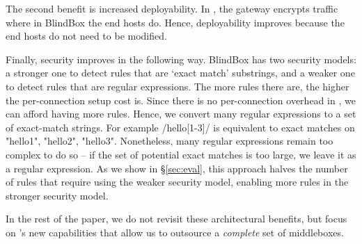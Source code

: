 The second benefit is increased deployability. In \sys, the gateway encrypts traffic where in BlindBox the end hosts do. Hence, deployability improves because the end hosts do not need to be modified.

Finally, security improves in the following way.
BlindBox has two security models: a stronger one to detect rules that are `exact match' substrings, and a weaker one to detect rules that are regular expressions. The more rules there are, the higher the per-connection setup cost is. 
Since there is no per-connection overhead  in \sys, we can afford having more rules. 
Hence, we convert many regular expressions to a set of exact-match strings. 
For example /hello[1-3]/ is equivalent to exact matches on "hello1", "hello2", "hello3".
Nonetheless, many regular expressions remain too complex to do so -- if the set of potential exact matches is too large, we leave it as a regular expression.
As we show in \S\ref{sec:eval}, this approach halves the number of rules that require using the weaker security model, enabling more rules in the stronger security model. 

In the rest of the paper, we do not revisit these architectural benefits, but focus  on \sys's new capabilities that allow us to outsource a {\it complete} set of middleboxes.
